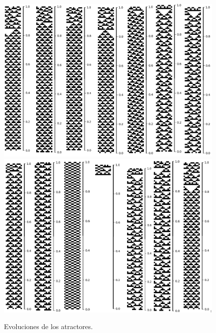 \documentclass[11pt]{article}
\begin{document}
			\begin{figure}[H]
			\centering
			\includegraphics[scale=0.3]{resources/Atractores54/atractor_54_size_12_res.png}
			\includegraphics[scale=0.3]{resources/Atractores54/atractor_54_size_12_res1.png}
			\caption{Evoluciones de los atractores.}\label{fig:picture}
			\end{figure}
\end{document}
